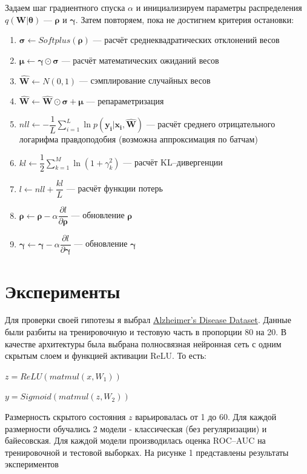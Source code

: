 \documentclass{article}
\begin{document}
Задаем шаг градиентного спуска $\alpha$ и инициализируем параметры распределения $q(\mathbf{W} | \pmb{\theta})$ — $\pmb{\rho}$ и $\pmb{\gamma}$. Затем повторяем, пока не достигнем критерия остановки:
\begin{enumerate}
    \item $\pmb{\sigma} \leftarrow Softplus(\pmb{\rho})$ --- расчёт среднеквадратических отклонений весов
    \item $\pmb{\mu} \leftarrow \pmb{\gamma} \odot \pmb{\sigma}$ --- расчёт математических ожиданий весов
    \item $\hat{\mathbf{W}} \leftarrow N(0, 1)$ --- сэмплирование случайных весов
    \item $\hat{\mathbf{W}} \leftarrow \hat{\mathbf{W}} \odot \pmb{\sigma} + \pmb{\mu}$ --- репараметризация
    \item $nll \leftarrow -\dfrac{1}{L}\sum_{i=1}^{L}{\ln{p( \mathbf{y_{i}} | \mathbf{x_{i}}, \mathbf{\hat{W}})}}$ --- расчёт среднего отрицательного логарифма правдоподобия (возможна аппроксимация по батчам)
    \item $kl \leftarrow \dfrac{1}{2}\sum_{k=1}^{M}\ln({1 + \gamma_{k}^{2}})$ --- расчёт KL--дивергенции
    \item $l \leftarrow nll + \dfrac{kl}{L}$ --- расчёт функции потерь
    \item $\pmb{\rho} \leftarrow \pmb{\rho} - \alpha \dfrac{\partial l}{\partial \pmb{\rho}}$ --- обновление $\pmb{\rho}$
    \item $\pmb{\gamma} \leftarrow \pmb{\gamma} - \alpha \dfrac{\partial l}{\partial \pmb{\gamma}}$ --- обновление $\pmb{\gamma}$
\end{enumerate}

\section{Эксперименты}

Для проверки своей гипотезы я выбрал \href{https://www.kaggle.com/datasets/rabieelkharoua/alzheimers-disease-dataset}{Alzheimer's Disease Dataset}. Данные были разбиты на тренировочную и тестовую часть в пропорции 80 на 20. В качестве архитектуры была выбрана полносвязная нейронная сеть с одним скрытым слоем и функцией активации ReLU. То есть:

$z = ReLU(matmul(x, W_1))$

$y = Sigmoid(matmul(z, W_2))$

Размерность скрытого состояния $z$ варьировалась от 1 до 60. Для каждой размерности обучались 2 модели - классическая (без регуляризации) и байесовская. Для каждой модели производилась оценка ROC--AUC на тренировочной и тестовой выборках. На рисунке 1 представлены результаты экспериментов
\end{document}
